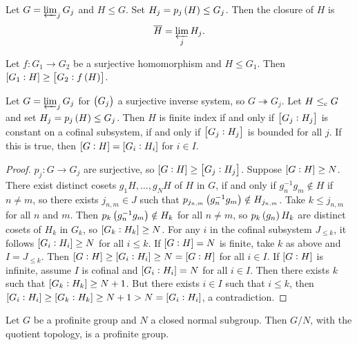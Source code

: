 \begin{proposition}
Let $ G = \varprojlim_j G_j $ and $ H \le G $. Set $ H_j = p_j\br{H} \le G_j $. Then the closure of $ H $ is
$$ \overline{H} = \varprojlim_j H_j. $$
\end{proposition}

\begin{lemma}
Let $ f : G_1 \to G_2 $ be a surjective homomorphism and $ H \le G_1 $. Then $ \sbr{G_1 : H} \ge \sbr{G_2 : f\br{H}} $.
\end{lemma}

\begin{proposition}
Let $ G = \varprojlim_j G_j $ for $ \br{G_j} $ a surjective inverse system, so $ G \twoheadrightarrow G_j $. Let $ H \le_{\mathrm{c}} G $ and set $ H_j = p_j\br{H} \le G_j $. Then $ H $ is finite index if and only if $ \sbr{G_j : H_j} $ is constant on a cofinal subsystem, if and only if $ \sbr{G_j : H_j} $ is bounded for all $ j $. If this is true, then $ \sbr{G : H} = \sbr{G_i : H_i} $ for $ i \in I $.
\end{proposition}

\begin{proof}
$ p_j : G \to G_j $ are surjective, so $ \sbr{G : H} \ge \sbr{G_j : H_j} $. Suppose $ \sbr{G : H} \ge N $. There exist distinct cosets $ g_1H, \dots, g_NH $ of $ H $ in $ G $, if and only if $ g_n^{-1}g_m \notin H $ if $ n \ne m $, so there exists $ j_{n, m} \in J $ such that $ p_{j_{n, m}}\br{g_n^{-1}g_m} \notin H_{j_{n, m}} $. Take $ k \le j_{n, m} $ for all $ n $ and $ m $. Then $ p_k\br{g_n^{-1}g_m} \notin H_k $ for all $ n \ne m $, so $ p_k\br{g_n}H_k $ are distinct cosets of $ H_k $ in $ G_k $, so $ \sbr{G_k : H_k} \ge N $. For any $ i $ in the cofinal subsystem $ J_{\le k} $, it follows $ \sbr{G_i : H_i} \ge N $ for all $ i \le k $. If $ \sbr{G : H} = N $ is finite, take $ k $ as above and $ I = J_{\le k} $. Then $ \sbr{G : H} \ge \sbr{G_i : H_i} \ge N = \sbr{G : H} $ for all $ i \in I $. If $ \sbr{G : H} $ is infinite, assume $ I $ is cofinal and $ \sbr{G_i : H_i} = N $ for all $ i \in I $. Then there exists $ k $ such that $ \sbr{G_k : H_k} \ge N + 1 $. But there exists $ i \in I $ such that $ i \le k $, then $ \sbr{G_i : H_i} \ge \sbr{G_k : H_k} \ge N + 1 > N = \sbr{G_i : H_i} $, a contradiction.
\end{proof}

\begin{proposition}
Let $ G $ be a profinite group and $ N $ a closed normal subgroup. Then $ G / N $, with the quotient topology, is a profinite group.
\end{proposition}

